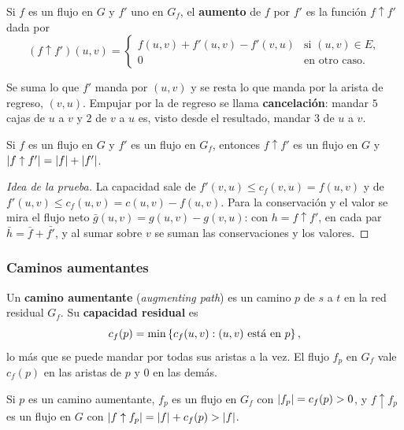 \documentclass[11pt,letterpaper]{article}
\begin{document}
\begin{definicion}[Aumento]
  Si $f$ es un flujo en $G$ y $f'$ uno en $G_f$, el \textbf{aumento}
  de $f$ por $f'$ es la función $f \uparrow f'$ dada por
  \[
    (f \uparrow f')(u, v) =
    \begin{cases}
      f(u, v) + f'(u, v) - f'(v, u) & \text{si } (u, v) \in E , \\
      0 & \text{en otro caso.}
    \end{cases}
  \]
\end{definicion}

Se suma lo que $f'$ manda por $(u, v)$ y se resta lo que manda por la
arista de regreso, $(v, u)$. Empujar por la de regreso se llama
\textbf{cancelación}: mandar $5$ cajas de $u$ a $v$ y $2$ de $v$ a $u$
es, visto desde el resultado, mandar $3$ de $u$ a $v$.

\begin{lema}\label{lem:flujo-aumento}
  Si $f$ es un flujo en $G$ y $f'$ es un flujo en $G_f$, entonces
  $f \uparrow f'$ es un flujo en $G$ y
  $\left\lvert f \uparrow f' \right\rvert = \left\lvert f \right\rvert + \left\lvert f' \right\rvert$.
\end{lema}

\begin{proof}[Idea de la prueba]
  La capacidad sale de $f'(v, u) \le c_f(v, u) = f(u, v)$ y de
  $f'(u, v) \le c_f(u, v) = c(u, v) - f(u, v)$. Para la conservación y
  el valor se mira el flujo neto $\bar{g}(u, v) = g(u, v) - g(v, u)$:
  con $h = f \uparrow f'$, en cada par $\bar{h} = \bar{f} + \bar{f'}$,
  y al sumar sobre $v$ se suman las conservaciones y los valores.
\end{proof}

\subsubsection*{Caminos aumentantes}

\begin{definicion}
  Un \textbf{camino aumentante} (\textit{augmenting path}) es un
  camino $p$ de $s$ a $t$ en la red residual $G_f$. Su
  \textbf{capacidad residual} es
  \[
    c_f(p) = \min\left\{ c_f(u, v) : (u, v) \text{ está en } p \right\} ,
  \]
  lo más que se puede mandar por todas sus aristas a la vez. El flujo
  $f_p$ en $G_f$ vale $c_f(p)$ en las aristas de $p$ y $0$ en las
  demás.
\end{definicion}

\begin{lema}\label{lem:flujo-camino}
  Si $p$ es un camino aumentante, $f_p$ es un flujo en $G_f$ con
  $\left\lvert f_p \right\rvert = c_f(p) > 0$, y $f \uparrow f_p$ es un flujo en $G$ con
  $\left\lvert f \uparrow f_p \right\rvert = \left\lvert f \right\rvert + c_f(p) > \left\lvert f \right\rvert$.
\end{lema}
\end{document}

